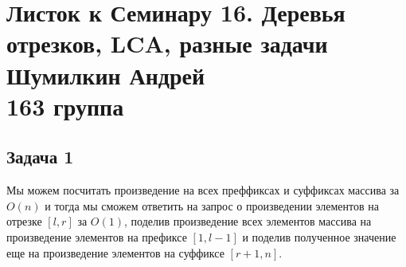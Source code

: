 

	\section{Листок к Семинару 16. Деревья отрезков, LCA, разные задачи \\ Шумилкин Андрей \\ 163 группа}
	
	\subsection{Задача 1}
	Мы можем посчитать произведение на всех преффиксах и суффиксах массива за $O(n)$ и тогда мы сможем ответить на запрос о произведении элементов на отрезке $[l, r]$ за $O(1)$, поделив произведение всех элементов массива на произведение элементов на префиксе $[1, l-1]$ и поделив полученное значение еще на произведение элементов на суффиксе $[r+1, n]$.

	